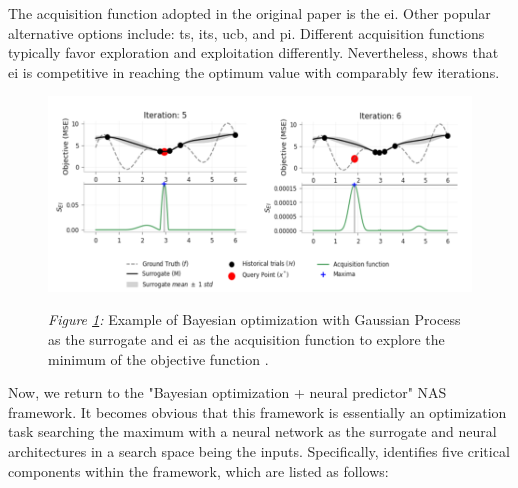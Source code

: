 \documentclass[a4paper,oneside,bibliography=totoc]{scrbook}
\begin{document}
The acquisition function adopted in the original paper \cite{Mockus1978} is the \gls{ei}. Other popular alternative options include: \gls{ts}, \gls{its}, \gls{ucb}, and \gls{pi}. Different acquisition functions typically favor exploration and exploitation differently. Nevertheless, \cite{agnihotri2020exploring} shows that \gls{ei} is competitive in reaching the optimum value with comparably few iterations. 

\begin{figure}[htbp]
	\centering
	\includegraphics[scale=0.4]{figs/overview_bo.png}
	\label{fig: bo}
	\parbox{\linewidth}{
	\vspace{0.5em}
 	{\small \textit{Figure \ref{fig: bo}:} Example of Bayesian optimization with Gaussian Process as the surrogate and \gls{ei} as the acquisition function to explore the minimum of the objective function \cite{agnihotri2020exploring}.
 	}
 	}
\end{figure}

Now, we return to the "Bayesian optimization + neural predictor" NAS framework. It becomes obvious that this framework is essentially an optimization task searching the maximum with a neural network as the surrogate and neural architectures in a search space being the inputs. Specifically, \cite{white2019bananas} identifies five critical components within the framework, which are listed as follows:
\end{document}
